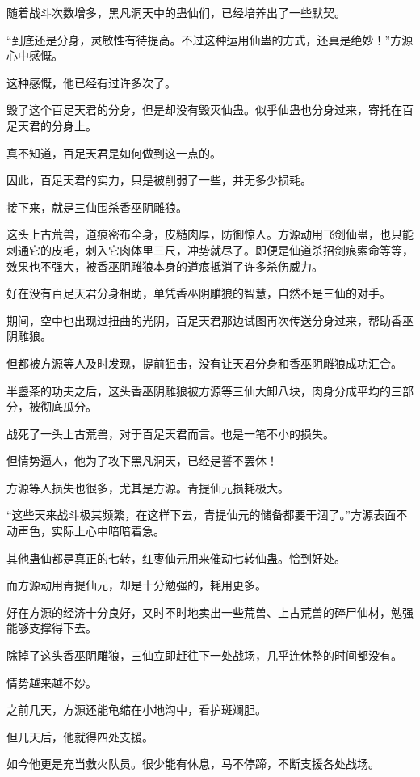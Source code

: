 \begin{this_body}
随着战斗次数增多，黑凡洞天中的蛊仙们，已经培养出了一些默契。

“到底还是分身，灵敏性有待提高。不过这种运用仙蛊的方式，还真是绝妙！”方源心中感慨。

这种感慨，他已经有过许多次了。

毁了这个百足天君的分身，但是却没有毁灭仙蛊。似乎仙蛊也分身过来，寄托在百足天君的分身上。

真不知道，百足天君是如何做到这一点的。

因此，百足天君的实力，只是被削弱了一些，并无多少损耗。

接下来，就是三仙围杀香巫阴雕狼。

这头上古荒兽，道痕密布全身，皮糙肉厚，防御惊人。方源动用飞剑仙蛊，也只能刺通它的皮毛，刺入它肉体里三尺，冲势就尽了。即便是仙道杀招剑痕索命等等，效果也不强大，被香巫阴雕狼本身的道痕抵消了许多杀伤威力。

好在没有百足天君分身相助，单凭香巫阴雕狼的智慧，自然不是三仙的对手。

期间，空中也出现过扭曲的光阴，百足天君那边试图再次传送分身过来，帮助香巫阴雕狼。

但都被方源等人及时发现，提前狙击，没有让天君分身和香巫阴雕狼成功汇合。

半盏茶的功夫之后，这头香巫阴雕狼被方源等三仙大卸八块，肉身分成平均的三部分，被彻底瓜分。

战死了一头上古荒兽，对于百足天君而言。也是一笔不小的损失。

但情势逼人，他为了攻下黑凡洞天，已经是誓不罢休！

方源等人损失也很多，尤其是方源。青提仙元损耗极大。

“这些天来战斗极其频繁，在这样下去，青提仙元的储备都要干涸了。”方源表面不动声色，实际上心中暗暗着急。

其他蛊仙都是真正的七转，红枣仙元用来催动七转仙蛊。恰到好处。

而方源动用青提仙元，却是十分勉强的，耗用更多。

好在方源的经济十分良好，又时不时地卖出一些荒兽、上古荒兽的碎尸仙材，勉强能够支撑得下去。

除掉了这头香巫阴雕狼，三仙立即赶往下一处战场，几乎连休整的时间都没有。

情势越来越不妙。

之前几天，方源还能龟缩在小地沟中，看护斑斓胆。

但几天后，他就得四处支援。

如今他更是充当救火队员。很少能有休息，马不停蹄，不断支援各处战场。


\end{this_body}
